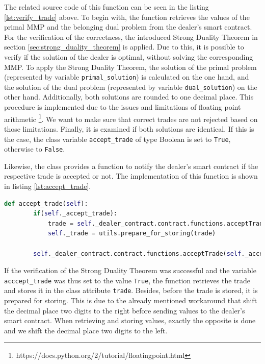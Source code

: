 The related source code of this function can be seen in the listing \ref{lst:verify_trade} above. 
To begin with, the function retrieves the values of the primal MMP and
the belonging dual problem from the dealer's smart contract. For the verification of the correctness, the introduced Strong Duality Theorem
in section \ref{sec:strong_duality_theorem} is applied. 
Due to this, it is possible to verify if the solution of the dealer is optimal, without solving the corresponding
MMP.
To apply the Strong Duality Theorem, the solution of the primal problem (represented by variable \verb|primal_solution|) is calculated
on the one hand, and the solution of the dual problem (represented by variable \verb|dual_solution|) on the other hand.
Additionally, both solutions are rounded to one decimal place. This procedure is implemented due to the issues and limitations of 
floating point arithmetic \footnote{https://docs.python.org/2/tutorial/floatingpoint.html}. 
We want to make sure that correct trades are not rejected based on those limitations.
Finally, it is examined if both solutions are identical. If this is the case, the class variable \verb|accept_trade| of type Boolean is
set to \verb|True|, otherwise to \verb|False|.

Likewise, the class provides a function to notify the dealer's smart contract if the respective trade is accepted or not.
The implementation of this function is shown in listing \ref{lst:accept_trade}.

\begin{lstlisting}[float=htbp, label=lst:accept_trade, caption=Notification of trade acceptance, language=Python]
    def accept_trade(self):
        if(self._accept_trade):
            trade = self._dealer_contract.contract.functions.acceptTrade(self._accept_trade).call({'from': self._account_address})
            self._trade = utils.prepare_for_storing(trade)

        self._dealer_contract.contract.functions.acceptTrade(self._accept_trade).transact({'from': self._account_address})

\end{lstlisting}

If the verification of the Strong Duality Theorem was successful and the variable \verb|acccept_trade| was thus set to the value \verb|True|,
the function retrieves the trade and stores it in the class attribute \verb|trade|. Besides, before the trade is stored, it is 
prepared for storing. This is due to the already mentioned workaround that shift the decimal place two digits to the right before 
sending values to the dealer's smart contract. When retrieving and storing values, exactly the opposite is done and we shift the decimal place 
two digits to the left. 

